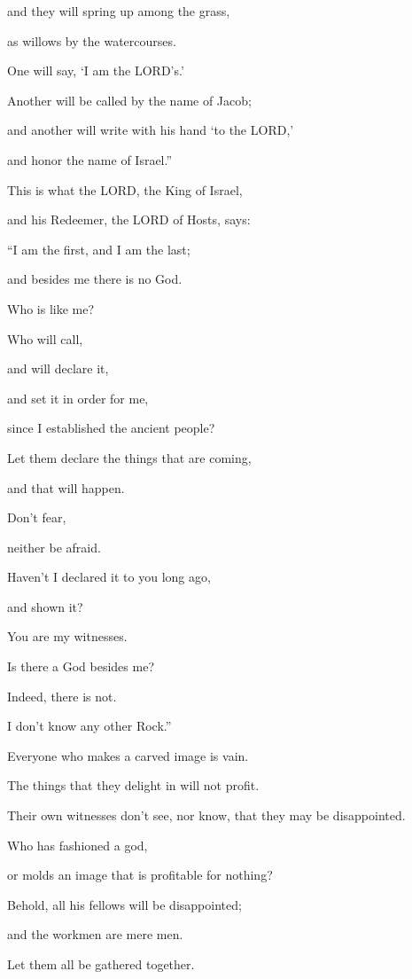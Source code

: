 \myverse{}and they will spring up among the grass,

as willows by the watercourses.

\myverse{}One will say, ‘I am the LORD’s.’

Another will be called by the name of Jacob;

and another will write with his hand ‘to the LORD,’

and honor the name of Israel.”


\vspace{\baselineskip} \myverse{}This is what the LORD, the King of Israel,

and his Redeemer, the LORD of Hosts, says:

“I am the first, and I am the last;

and besides me there is no God.

\myverse{}Who is like me?

Who will call,

and will declare it,

and set it in order for me,

since I established the ancient people?

Let them declare the things that are coming,

and that will happen.

\myverse{}Don’t fear,

neither be afraid.

Haven’t I declared it to you long ago,

and shown it?

You are my witnesses.

Is there a God besides me?

Indeed, there is not.

I don’t know any other Rock.”


\vspace{\baselineskip} \myverse{}Everyone who makes a carved image is vain.

The things that they delight in will not profit.

Their own witnesses don’t see, nor know, that they may be disappointed.

\myverse{}Who has fashioned a god,

or molds an image that is profitable for nothing?

\myverse{}Behold, all his fellows will be disappointed;

and the workmen are mere men.

Let them all be gathered together.


